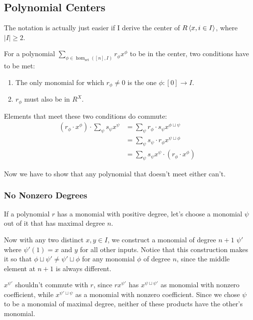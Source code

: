 \documentclass[12pt]{article}
\begin{document}
\subsection{Polynomial Centers}

The notation is actually just easier if I derive the
center of $R\braket{x, i \in I}$, where $|I| \ge 2$.

For a polynomial $\sum_{\phi \in \hom_{\text{set}}([n], I)} r_\phi x^\phi$
to be in the center, two conditions have to be met:
\begin{enumerate}[nolistsep]
  \item The only monomial for which $r_\phi \ne 0$ is the one $\phi: [0] \to I$.
  \item $r_\phi$ must also be in $R^X$.
\end{enumerate}

Elements that meet these two conditions do commute:
\begin{align*}
  \left(r_\phi \cdot x^\phi\right) \cdot \sum_{\psi} s_\psi x^\psi
   & = \sum_{\psi} r_\phi \cdot s_\psi x^{\phi \sqcup \psi}             \\
   & = \sum_{\psi} s_\psi \cdot r_\phi x^{\psi \sqcup \phi}             \\
   & = \sum_{\psi} s_\psi x^\psi \cdot \left(r_\phi \cdot x^\phi\right)
\end{align*}

Now we have to show that any polynomial that doesn't meet either can't.

\subsubsection{No Nonzero Degrees}

If a polynomial $r$ has a monomial with positive degree, let's choose
a monomial $\psi$ out of it that has maximal degree $n$.

Now with any two distinct $x, y \in I$,
we construct a monomial of degree $n+1$ $\psi'$
where $\psi'(1)=x$ and $y$ for all other inputs.
Notice that this construction makes it so that $\phi \sqcup \psi' \ne \psi' \sqcup \phi$
for any monomial $\phi$ of degree $n$, since the middle element at $n+1$ is always different.

$x^{\psi'}$ shouldn't commute with $r$, since $r x^{\psi'}$
has $x^{\psi \sqcup \psi'}$ as monomial with nonzero coefficient,
while $x^{\psi' \sqcup \psi}$ as a monomial with nonzero coefficient.
Since we chose $\psi$ to be a monomial of maximal degree, neither
of these products have the other's monomial.
\end{document}
